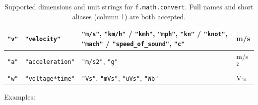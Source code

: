 \begin{table}[h]
\begin{tabular}{|l|l|p{10cm}|l|}
\hline
\texttt{"v"} & \texttt{"velocity"} & \texttt{"m/s"}, \texttt{"km/h"} / \texttt{"kmh"}, \texttt{"mph"}, \texttt{"kn"} / \texttt{"knot"}, \texttt{"mach"} / \texttt{"speed\_of\_sound"}, \texttt{"c"} & m/s \\
\hline
\texttt{"a"} & \texttt{"acceleration"} & \texttt{"m/s2"}, \texttt{"g"} & m/s$^2$ \\
\hline
\texttt{"w"} & \texttt{"voltage*time"} & \texttt{"Vs"}, \texttt{"mVs"}, \texttt{"uVs"}, \texttt{"Wb"} & V$\cdot$s \\
\hline
\end{tabular}
\caption{Supported dimensions and unit strings for \texttt{f.math.convert}. Full names and short aliases (column 1) are both accepted.}
\label{tab:unit-strings}
\end{table}

Examples:
